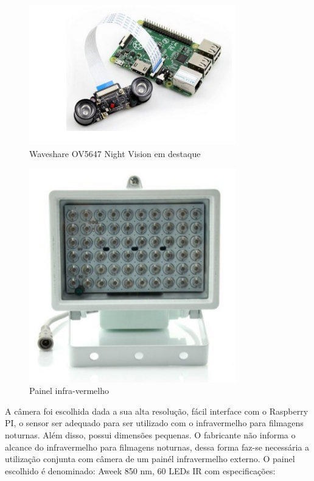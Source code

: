 \begin{figure}[H]
  \centering
  \includegraphics[width=0.8\textwidth]{figuras/RSP}
  \caption[Waveshare OV5647 Night Vision em destaque]{Waveshare OV5647 Night Vision em destaque~\cite{amazon1}}
  \label{img:Waveshare}
\end{figure}

\begin{figure}[H]
  \centering
  \includegraphics[width=0.8\textwidth]{figuras/painel}
  \caption[Painel infra-vermelho]{Painel infra-vermelho~\cite{amazon2}}
  \label{img:painel}
\end{figure}

A câmera foi escolhida dada a sua alta resolução, fácil interface com o Raspberry PI, o sensor ser adequado para ser utilizado com o infravermelho para filmagens noturnas. Além disso, possui dimensões pequenas. O fabricante não informa o alcance do infravermelho para filmagens noturnas, dessa forma faz-se necessária a utilização conjunta com  câmera de um painél infravermelho externo. O painel escolhido é denominado: Aweek 850 nm, 60 LEDs IR com especificações:

